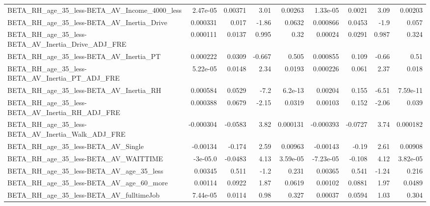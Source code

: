 \begin{tabular}{lrrrrrrrr}
BETA\_RH\_age\_35\_less-BETA\_AV\_Income\_4000\_less       &    2.47e-05 &      0.00371 &     3.01 &  0.00263 &   1.33e-05 &      0.0021 &         3.09 &       0.00203 \\
BETA\_RH\_age\_35\_less-BETA\_AV\_Inertia\_Drive          &    0.000331 &        0.017 &    -1.86 &   0.0632 &   0.000866 &      0.0453 &         -1.9 &         0.057 \\
BETA\_RH\_age\_35\_less-BETA\_AV\_Inertia\_Drive\_ADJ\_FRE  &    0.000111 &       0.0137 &    0.995 &     0.32 &    0.00024 &      0.0291 &        0.987 &         0.324 \\
BETA\_RH\_age\_35\_less-BETA\_AV\_Inertia\_PT             &    0.000222 &       0.0309 &   -0.667 &    0.505 &   0.000855 &       0.109 &        -0.66 &          0.51 \\
BETA\_RH\_age\_35\_less-BETA\_AV\_Inertia\_PT\_ADJ\_FRE     &    5.22e-05 &       0.0148 &     2.34 &   0.0193 &   0.000226 &       0.061 &         2.37 &         0.018 \\
BETA\_RH\_age\_35\_less-BETA\_AV\_Inertia\_RH             &    0.000584 &       0.0529 &     -7.2 &  6.2e-13 &    0.00204 &       0.155 &        -6.51 &      7.59e-11 \\
BETA\_RH\_age\_35\_less-BETA\_AV\_Inertia\_RH\_ADJ\_FRE     &    0.000388 &       0.0679 &    -2.15 &   0.0319 &    0.00103 &       0.152 &        -2.06 &         0.039 \\
BETA\_RH\_age\_35\_less-BETA\_AV\_Inertia\_Walk\_ADJ\_FRE   &   -0.000304 &      -0.0583 &     3.82 & 0.000131 &  -0.000393 &     -0.0727 &         3.74 &      0.000182 \\
BETA\_RH\_age\_35\_less-BETA\_AV\_Single                 &    -0.00134 &       -0.174 &     2.59 &  0.00963 &   -0.00143 &       -0.19 &         2.61 &       0.00908 \\
BETA\_RH\_age\_35\_less-BETA\_AV\_WAITTIME               &    -3e-05.0 &      -0.0483 &     4.13 & 3.59e-05 &  -7.23e-05 &      -0.108 &         4.12 &      3.82e-05 \\
BETA\_RH\_age\_35\_less-BETA\_AV\_age\_35\_less            &     0.00345 &        0.511 &     -1.2 &    0.231 &    0.00365 &       0.541 &        -1.24 &         0.216 \\
BETA\_RH\_age\_35\_less-BETA\_AV\_age\_60\_more            &     0.00114 &       0.0922 &     1.87 &   0.0619 &    0.00102 &      0.0881 &         1.97 &        0.0489 \\
BETA\_RH\_age\_35\_less-BETA\_AV\_fulltimeJob            &    7.44e-05 &       0.0114 &     0.98 &    0.327 &    0.00037 &      0.0594 &         1.03 &         0.304 \\

\end{tabular}
